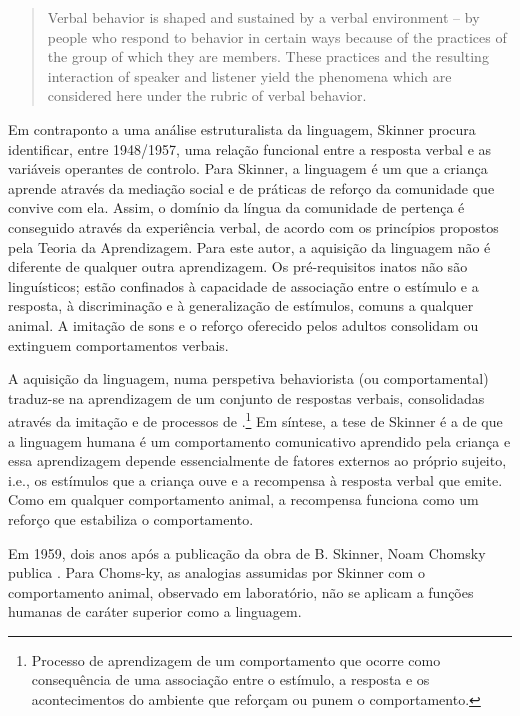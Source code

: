 \documentclass[output=paper]{LSP/langsci}
\begin{document}
\begin{quote}
Verbal behavior is shaped and sustained by a verbal environment -- by people who respond to behavior in certain ways because of the practices of the group of which they are members. These practices and the resulting interaction of speaker and listener yield the phenomena which are considered here under the rubric of verbal behavior. \citep[226]{skinner57}
\end{quote}

Em contraponto a uma análise estruturalista da linguagem, Skinner procura identificar, entre 1948/1957, uma relação funcional entre a resposta verbal e as variáveis operantes de controlo. Para Skinner, a linguagem é um  que a criança aprende através da mediação social e de práticas de reforço da comunidade que convive com ela. Assim, o domínio da língua da comunidade de pertença é conseguido através da experiência verbal, de acordo com os princípios propostos pela Teoria da Aprendizagem. Para este autor, a aquisição da linguagem não é diferente de qualquer outra aprendizagem. Os pré-requisitos inatos não são linguísticos; estão confinados à capacidade de associação entre o estímulo e a resposta, à discriminação e à generalização de estímulos, comuns a qualquer animal. A imitação de sons e o reforço oferecido pelos adultos consolidam ou extinguem comportamentos verbais.

A aquisição da linguagem, numa perspetiva behaviorista (ou comportamental) traduz-se na aprendizagem de um conjunto de respostas verbais, consolidadas através da imitação e de processos de .\footnote{Processo de aprendizagem de um comportamento que ocorre como consequência de uma associação entre o estímulo, a resposta e os acontecimentos do ambiente que reforçam ou punem o comportamento.} Em síntese, a tese de Skinner é a de que a linguagem humana é um comportamento comunicativo aprendido pela criança e essa aprendizagem depende essencialmente de fatores externos ao próprio sujeito, i.e., os estímulos que a criança ouve e a recompensa à resposta verbal que emite. Como em qualquer comportamento animal, a recompensa funciona como um reforço que estabiliza o comportamento. 

Em 1959, dois anos após a publicação da obra  de B. Skinner, Noam Chomsky publica . Para Choms-\linebreak ky, as analogias assumidas por Skinner com o comportamento animal, observado em laboratório, não se aplicam a funções humanas de caráter superior como a linguagem.
\end{document}

